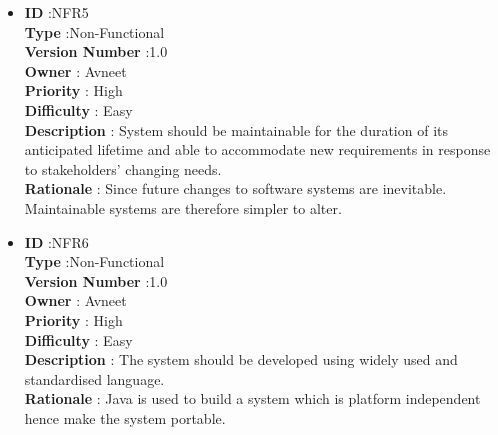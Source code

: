 \documentclass[a4paper,12pt]{report}
\begin{document}
\begin{itemize}
	\item
    \textbf{ID } \hspace{3cm} :NFR5  \\
	\textbf{Type } \hspace{2.4cm}  :Non-Functional\\
	\textbf{Version Number} \hspace{0.3cm} :1.0  \\
	\textbf{Owner } \hspace{1.98cm} : Avneet \\
	\textbf{Priority } \hspace{1.75cm} : High\\
	\textbf{Difficulty } \hspace{1.5cm} : Easy\\
	\textbf{Description }\hspace{1.2cm} : System should be maintainable for the duration of its anticipated lifetime and able to accommodate new requirements in response to stakeholders' changing needs. \\
	\textbf{Rationale }\hspace{1.6cm} : Since future changes to software systems are inevitable. Maintainable systems are therefore simpler to alter.\\

	\item
    \textbf{ID } \hspace{3cm} :NFR6  \\
	\textbf{Type } \hspace{2.4cm}  :Non-Functional\\
	\textbf{Version Number} \hspace{0.3cm} :1.0  \\
	\textbf{Owner } \hspace{1.98cm} : Avneet \\
	\textbf{Priority } \hspace{1.75cm} : High\\
	\textbf{Difficulty } \hspace{1.5cm} : Easy\\
	\textbf{Description }\hspace{1.2cm} : The system should be developed using widely used and standardised language. \\
	\textbf{Rationale }\hspace{1.6cm} : Java is used to build a system which is platform independent hence make the system portable.\\


\end{itemize}
\pagebreak
\end{document}
